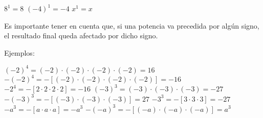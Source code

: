 \begin{ejemplos}[1][\textbullet]
  \task $8^1 = 8$
  \task $(-4)^1 = -4$
  \task $x^1 = x$
\end{ejemplos}




Es importante tener en cuenta que, si una potencia va precedida por
algún signo, el resultado final queda afectado por dicho signo.  

Ejemplos:

\begin{ejemplos}[1][\textbullet]
  \task $(-2)^4 = (-2)\cdot(-2)\cdot(-2)\cdot(-2) = 16$
  \task $-(-2)^4 = -[(-2)\cdot(-2)\cdot(-2)\cdot(-2)] = -16$
  \task $-2^4 = -[2 \cdot 2 \cdot 2 \cdot 2] = -16$
  \task $(-3)^3 = (-3)\cdot(-3)\cdot(-3) = -27$
  \task $-(-3)^3 = -[(-3)\cdot(-3)\cdot(-3)] = 27$
  \task $-3^3 = -[3 \cdot 3 \cdot 3] = -27$
  \task $-a^3 = -[a \cdot a \cdot a] = -a^3$
  \task $-(-a)^3 = -[(-a)\cdot(-a)\cdot(-a)] = a^3$
\end{ejemplos}









